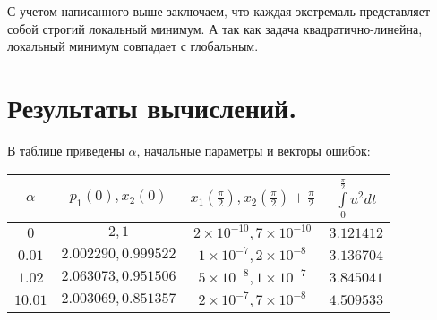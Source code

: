 \documentclass{article}
\begin{document}
С учетом написанного выше заключаем, что каждая экстремаль представляет собой строгий локальный минимум.
А так как задача квадратично-линейна, локальный минимум совпадает с глобальным.
\section{Результаты вычислений.}
В таблице приведены $\alpha$, начальные параметры и векторы ошибок:

\begin{tabular}{|c|c|c|c|}
  \hline
   $\alpha$ & $p_{1}(0), x_{2}(0)$ & $x_{1}(\frac \pi 2), x_{2}(\frac \pi 2) + \frac \pi 2$ & $\int\limits_{0}^{\frac \pi 2}u^{2}dt$\\
  \hline
    $0$ & $2, 1$ & $2\times10^{-10}, 7\times10^{-10}$ & $3.121412$\\
    $0.01$ &$2.002290, 0.999522$ &$1\times 10^{-7}, 2\times 10^{-8}$ & $3.136704$\\
    $1.02$ &$2.063073, 0.951506$ &$5\times 10^{-8}, 1\times 10^{-7}$ & $3.845041$\\
    $10.01$ &$2.003069, 0.851357$ &$2\times 10^{-7}, 7\times 10^{-8}$ & $4.509533$\\
  \hline
\end{tabular}
\end{document}
